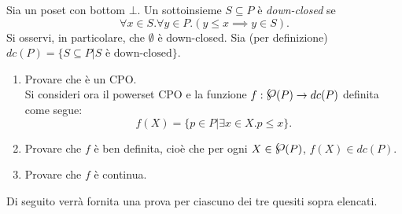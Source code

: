\newcommand{\powerset}[1]{\raisebox{.15\baselineskip}{\Large\ensuremath{\wp}}(#1)}

{
  Sia  un poset con bottom $\bot$. Un sottoinsieme
  $S \subseteq P$ è \textit{down-closed} se
  $$
  \forall{x\in S}.\forall{y}\in P.(y \leq x \implies y \in S).
  $$
  Si osservi, in particolare, che $\emptyset$ è down-closed. Sia (per
  definizione) $dc(P) = \{S \subseteq P | S \text{ è down-closed}\}$.
  \begin{enumerate}
    \item Provare che  è un CPO. \vspace{.3em} \\
  \noindent Si consideri ora il powerset CPO \setRel{\powerset{P}}{\subseteq} e
    la funzione $f : \powerset{P} \to dc(P)$ definita come segue:
    $$
    f(X) = \{p \in P | \exists{x}\in X.p \leq x\}.
    $$
    \item Provare che $f$ è ben definita, cioè che per ogni
      $X \in \powerset{P}$, $f(X) \in dc(P)$.
    \item Provare che $f$ è continua.
  \end{enumerate}
}
{}

Di seguito verrà fornita una prova per ciascuno dei tre quesiti sopra elencati.

